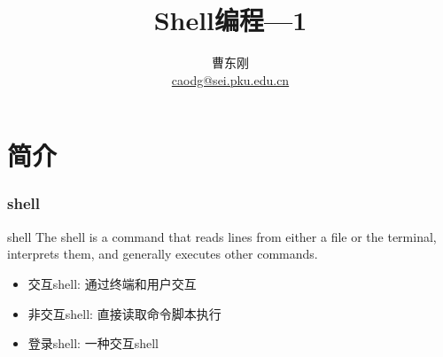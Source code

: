 \documentclass[compress]{beamer}
\begin{document}
					
\title{Shell编程---1}

\author[\href{http://c.pku.edu.cn/}{http://c.pku.edu.cn/}]
{曹东刚\\ \href{mailto:caodg@sei.pku.edu.cn}{caodg@sei.pku.edu.cn}}


\date{}


\begin{frame}
	\titlepage
\end{frame}


\section{简介}

\begin{frame}
    \frametitle{shell}
    \begin{block}{shell}
    The shell is a command that reads lines from either a file or
        the terminal, interprets them, and generally executes other commands.
        \begin{itemize}
            \item 交互shell: 通过终端和用户交互
            \item 非交互shell: 直接读取命令脚本执行
            \item 登录shell: 一种交互shell
        \end{itemize}
    \end{block}
\end{frame}
\end{document}
